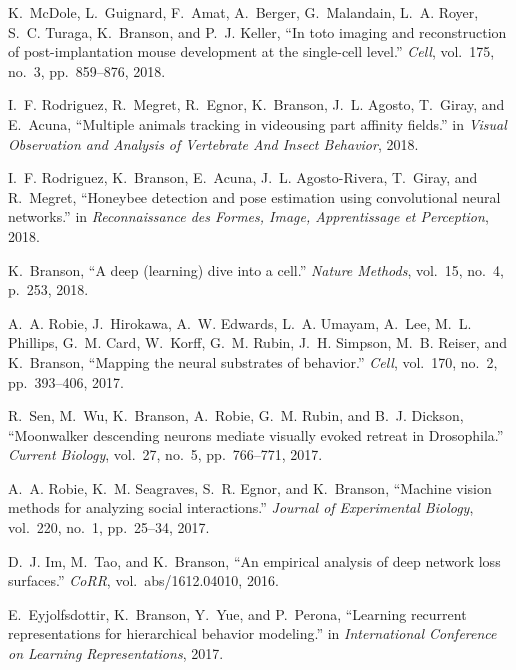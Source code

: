 \begin{cvenum}
\item K.~McDole, L.~Guignard, F.~Amat, A.~Berger, G.~Malandain, L.~A. Royer, S.~C.
  Turaga, K.~Branson, and P.~J. Keller, ``In toto imaging and reconstruction of
  post-implantation mouse development at the single-cell level.'' {\em Cell},
  vol.~175, no.~3, pp.~859--876, 2018.

\item I.~F. Rodriguez, R.~Megret, R.~Egnor, K.~Branson, J.~L. Agosto, T.~Giray, and
  E.~Acuna, ``Multiple animals tracking in videousing part affinity fields.''
  in {\em Visual Observation and Analysis of Vertebrate And Insect Behavior},
  2018.

\item I.~F. Rodriguez, K.~Branson, E.~Acuna, J.~L. Agosto-Rivera, T.~Giray, and
  R.~Megret, ``Honeybee detection and pose estimation using convolutional
  neural networks.'' in {\em Reconnaissance des Formes, Image, Apprentissage et
  Perception}, 2018.

\item K.~Branson, ``A deep (learning) dive into a cell.'' {\em Nature Methods},
  vol.~15, no.~4, p.~253, 2018.

\item A.~A. Robie, J.~Hirokawa, A.~W. Edwards, L.~A. Umayam,
  A.~Lee, M.~L. Phillips, G.~M. Card, W.~Korff, G.~M. Rubin, J.~H. Simpson,
  M.~B. Reiser, and K.~Branson, ``Mapping the neural substrates of behavior.''
  {\em Cell}, vol.~170, no.~2, pp.~393--406, 2017.

\item R.~Sen, M.~Wu, K.~Branson, A.~Robie, G.~M. Rubin, and B.~J. Dickson,
  ``Moonwalker descending neurons mediate visually evoked retreat in
  {D}rosophila.'' {\em Current Biology}, vol.~27, no.~5, pp.~766--771, 2017.

\item A.~A. Robie, K.~M. Seagraves, S.~R. Egnor, and K.~Branson, ``Machine vision
  methods for analyzing social interactions.'' {\em Journal of Experimental
  Biology}, vol.~220, no.~1, pp.~25--34, 2017.

\item D.~J. Im, M.~Tao, and K.~Branson, ``An empirical analysis of deep network loss
  surfaces.'' {\em CoRR}, vol.~abs/1612.04010, 2016.

\item E.~Eyjolfsdottir, K.~Branson, Y.~Yue, and P.~Perona,
  ``Learning recurrent representations for hierarchical behavior modeling.'' in
  {\em International Conference on Learning Representations},
  2017.


\end{cvenum}
